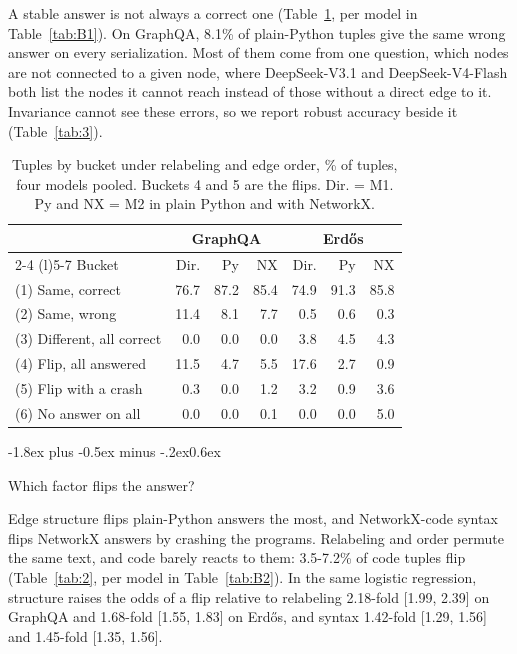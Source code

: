 \documentclass[11pt]{article}
\makeatletter
\renewcommand\subsection{\@startsection{subsection}{2}{\z@}
  {-1.8ex plus -0.5ex minus -.2ex}{0.6ex}
  {\normalsize\bfseries\raggedright}}
\makeatother
\begin{document}
A stable answer is not always a correct one (Table~\ref{tab:1}, per model in Table~\ref{tab:B1}). On GraphQA, 8.1\% of plain-Python tuples give the same wrong answer on every serialization. Most of them come from one question, which nodes are not connected to a given node, where DeepSeek-V3.1 and DeepSeek-V4-Flash both list the nodes it cannot reach instead of those without a direct edge to it. Invariance cannot see these errors, so we report robust accuracy beside it (Table~\ref{tab:3}).

\begin{table}[t]
\centering
\small\setlength{\tabcolsep}{3.2pt}
\begin{tabular}{@{}lrrrrrr@{}}
\toprule
 & \multicolumn{3}{c}{GraphQA} & \multicolumn{3}{c}{Erd\H{o}s} \\
\cmidrule(lr){2-4} \cmidrule(l){5-7}
Bucket & Dir. & Py & NX & Dir. & Py & NX \\
\midrule
(1) Same, correct & 76.7 & 87.2 & 85.4 & 74.9 & 91.3 & 85.8 \\
(2) Same, wrong & 11.4 & 8.1 & 7.7 & 0.5 & 0.6 & 0.3 \\
(3) Different, all correct & 0.0 & 0.0 & 0.0 & 3.8 & 4.5 & 4.3 \\
(4) Flip, all answered & 11.5 & 4.7 & 5.5 & 17.6 & 2.7 & 0.9 \\
(5) Flip with a crash & 0.3 & 0.0 & 1.2 & 3.2 & 0.9 & 3.6 \\
(6) No answer on all & 0.0 & 0.0 & 0.1 & 0.0 & 0.0 & 5.0 \\
\bottomrule
\end{tabular}
\caption{Tuples by bucket under relabeling and edge order, \% of tuples, four models pooled. Buckets 4 and 5 are the flips. Dir. = M1. Py and NX = M2 in plain Python and with NetworkX.}
\label{tab:1}
\end{table}

\subsection{Which factor flips the answer?}\label{sec:factor-results}

Edge structure flips plain-Python answers the most, and NetworkX-code syntax flips NetworkX answers by crashing the programs. Relabeling and order permute the same text, and code barely reacts to them: 3.5-7.2\% of code tuples flip (Table~\ref{tab:2}, per model in Table~\ref{tab:B2}). In the same logistic regression, structure raises the odds of a flip relative to relabeling 2.18-fold [1.99, 2.39] on GraphQA and 1.68-fold [1.55, 1.83] on Erdős, and syntax 1.42-fold [1.29, 1.56] and 1.45-fold [1.35, 1.56].
\end{document}
